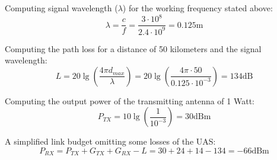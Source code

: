 Computing signal wavelength ($\lambda$) for the working frequency stated above:
\begin{equation*}\label{eq:tech_parameters2}
	\lambda = \frac{c}{f} = \frac{3\cdot 10^{8}}{2.4\cdot 10^{9}} 
	        = 0.125 \text{m}
\end{equation*}

Computing the path loss for a distance of 50 kilometers and the signal wavelength:
\begin{equation*}\label{eq:tech_parameters3}
	L = 20\lg\left (\frac{4\pi d_{max}}{\lambda} \right)
	  = 20\lg\left (\frac{4\pi \cdot 50}{0.125\cdot 10^{-3}} \right)
	  = 134 \text{dB} 
\end{equation*}


Computing the output power of the transmitting antenna of 1 Watt:
\begin{equation*}\label{eq:tech_parameters4}
	P_{TX} = 10\lg\left (\frac{1}{10^{-3}} \right)  
	       = 30 \text{dBm}
\end{equation*}


A simplified link budget omitting some losses of the UAS:
\begin{equation*}\label{eq:tech_parameters5}
	P_{RX} = P_{TX} + G_{TX} + G_{RX} - L  
	       = 30 + 24 + 14 - 134 = -66 \text{dBm}
\end{equation*}

